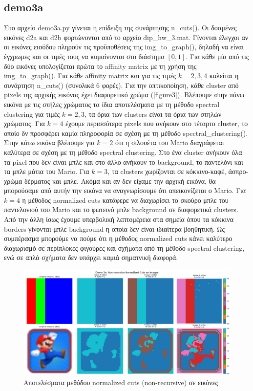 \documentclass{article}
\begin{document}
\subsection{demo3a} 
Στο αρχείο demo3a.py γίνεται η επίδειξη της συνάρτησης n\_cuts(). Οι
δοσμένες εικόνες d2a και d2b φορτώνονται από το αρχείο 
dip\_hw\_3.mat. Γίνονται έλεγχοι αν οι εικόνες εισόδου πληρούν τις προϋποθέσεις 
της img\_to\_graph(), δηλαδή να είναι έγχρωμες και οι τιμές τους να κυμαίνονται 
στο διάστημα $[0,1]$. Για κάθε μία από τις δύο εικόνες υπολογίζεται πρώτα το
affinity matrix με τη χρήση της img\_to\_graph(). Για κάθε affinity matrix και 
για τις τιμές $k=2,3,4$ καλείται η συνάρτηση n\_cuts() (συνολικά 6 φορές). Για την
οπτικοποίηση, κάθε cluster από pixels της αρχικής εικόνας έχει διαφορετικό χρώμα
(\autoref{figure3}). Βλέπουμε στην πάνω εικόνα με τις στήλες χρώματος
τα ίδια αποτελέσματα με τη μέθοδο spectral clustering για τιμές $k=2,3$, τα όρια 
των clusters είναι τα όρια των στηλών χρώματος. Για $k=4$ έχουμε περισσότερα
pixels που ανήκουν στο τέταρτο cluster, το οποίο δν προσφέρει καμία πληροφορία σε σχέση με τη μέθοδο 
spectral\_clustering().
Στην κάτω εικόνα βλέπουμε για $k=2$ ότι η σιλουέτα του Mario διαγράφεται 
καλύτερα σε σχέση με τη μέθοδο spectral clustering. Στο ένα cluster ανήκουν 
όλα τα pixel που δεν είναι μπλε και στο
άλλο ανήκουν το background, το παντελόνι και τα μπλε μάτια του Mario. Για $k=3$,
τα clusters χωρίζονται σε κόκκινο-καφέ, άσπρο-χρώμα δέρματος και μπλε. Ακόμα και
αν δεν είχαμε την αρχική εικόνα, θα μπορούσαμε από αυτήν την εικόνα να αναγνωρίσουμε
ότι απεικονίζεται ο Mario. Για $k=4$ η μέθοδος normalized cuts κατάφερε να διαχωρίσει
το σκούρο μπλε του παντελονιού του Mario και το φωτεινό μπλε background σε 
διαφορετικά clusters. Από την άλλη ίσως έχουμε υπερβολική λεπτομέρεια στα σημεία όπου 
τα κόκκινα borders γίνονται μπλε background η οποία δεν είναι ιδιαίτερα βοηθητική.
Ως συμπέρασμα μπορούμε να πούμε ότι η μέθοδος normalized cuts κάνει καλύτερο 
διαχωρισμό σε περίπλοκες φιγούρες και σχήματα από τη μέθοδο spectral clustering, 
ενώ σε απλά σχήματα δεν υπάρχει καμιά σηματνική διαφορά.

\begin{figure}
    \centering
    \includegraphics[width=\linewidth]{Figure_3.png}
    \caption{Αποτελέσματα μεθόδου normalized cuts (non-recursive) σε εικόνες}\label{figure3}
\end{figure}
\end{document}
